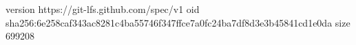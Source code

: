 version https://git-lfs.github.com/spec/v1
oid sha256:6e258caf343ac8281c4ba55746f347ffce7a0fc24ba7df8d3e3b45841cd1e0da
size 699208
